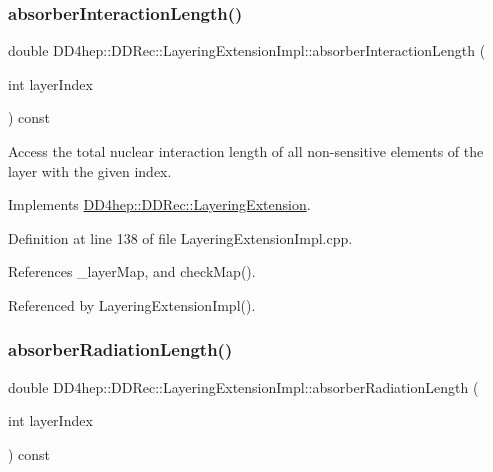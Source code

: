\subsubsection{\texorpdfstring{absorber\+Interaction\+Length()}{absorberInteractionLength()}}
{\footnotesize\ttfamily double D\+D4hep\+::\+D\+D\+Rec\+::\+Layering\+Extension\+Impl\+::absorber\+Interaction\+Length (\begin{DoxyParamCaption}\item[{int}]{layer\+Index }\end{DoxyParamCaption}) const\hspace{0.3cm}{\ttfamily [virtual]}}



Access the total nuclear interaction length of all non-\/sensitive elements of the layer with the given index. 



Implements \hyperlink{class_d_d4hep_1_1_d_d_rec_1_1_layering_extension_af18b1293c0631bd55798e7c73eddeb6b}{D\+D4hep\+::\+D\+D\+Rec\+::\+Layering\+Extension}.



Definition at line 138 of file Layering\+Extension\+Impl.\+cpp.



References \+\_\+layer\+Map, and check\+Map().



Referenced by Layering\+Extension\+Impl().

\hypertarget{class_d_d4hep_1_1_d_d_rec_1_1_layering_extension_impl_a81b2720593495043fbe86012b0936a37}{}\label{class_d_d4hep_1_1_d_d_rec_1_1_layering_extension_impl_a81b2720593495043fbe86012b0936a37} 
\subsubsection{\texorpdfstring{absorber\+Radiation\+Length()}{absorberRadiationLength()}}
{\footnotesize\ttfamily double D\+D4hep\+::\+D\+D\+Rec\+::\+Layering\+Extension\+Impl\+::absorber\+Radiation\+Length (\begin{DoxyParamCaption}\item[{int}]{layer\+Index }\end{DoxyParamCaption}) const\hspace{0.3cm}{\ttfamily [virtual]}}



